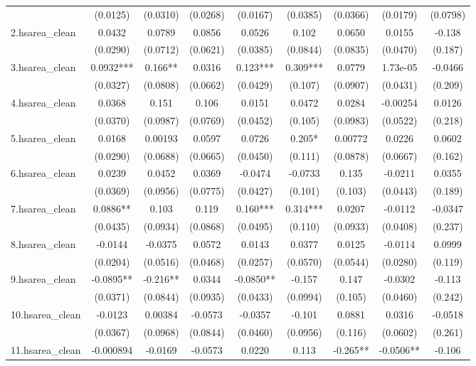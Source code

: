 \documentclass[]{article}
\begin{document}
\begin{tabular}{lcccccccc}
 & (0.0125) & (0.0310) & (0.0268) & (0.0167) & (0.0385) & (0.0366) & (0.0179) & (0.0798) \\
2.hsarea\_clean & 0.0432 & 0.0789 & 0.0856 & 0.0526 & 0.102 & 0.0650 & 0.0155 & -0.138 \\
 & (0.0290) & (0.0712) & (0.0621) & (0.0385) & (0.0844) & (0.0835) & (0.0470) & (0.187) \\
3.hsarea\_clean & 0.0932*** & 0.166** & 0.0316 & 0.123*** & 0.309*** & 0.0779 & 1.73e-05 & -0.0466 \\
 & (0.0327) & (0.0808) & (0.0662) & (0.0429) & (0.107) & (0.0907) & (0.0431) & (0.209) \\
4.hsarea\_clean & 0.0368 & 0.151 & 0.106 & 0.0151 & 0.0472 & 0.0284 & -0.00254 & 0.0126 \\
 & (0.0370) & (0.0987) & (0.0769) & (0.0452) & (0.105) & (0.0983) & (0.0522) & (0.218) \\
5.hsarea\_clean & 0.0168 & 0.00193 & 0.0597 & 0.0726 & 0.205* & 0.00772 & 0.0226 & 0.0602 \\
 & (0.0290) & (0.0688) & (0.0665) & (0.0450) & (0.111) & (0.0878) & (0.0667) & (0.162) \\
6.hsarea\_clean & 0.0239 & 0.0452 & 0.0369 & -0.0474 & -0.0733 & 0.135 & -0.0211 & 0.0355 \\
 & (0.0369) & (0.0956) & (0.0775) & (0.0427) & (0.101) & (0.103) & (0.0443) & (0.189) \\
7.hsarea\_clean & 0.0886** & 0.103 & 0.119 & 0.160*** & 0.314*** & 0.0207 & -0.0112 & -0.0347 \\
 & (0.0435) & (0.0934) & (0.0868) & (0.0495) & (0.110) & (0.0933) & (0.0408) & (0.237) \\
8.hsarea\_clean & -0.0144 & -0.0375 & 0.0572 & 0.0143 & 0.0377 & 0.0125 & -0.0114 & 0.0999 \\
 & (0.0204) & (0.0516) & (0.0468) & (0.0257) & (0.0570) & (0.0544) & (0.0280) & (0.119) \\
9.hsarea\_clean & -0.0895** & -0.216** & 0.0344 & -0.0850** & -0.157 & 0.147 & -0.0302 & -0.113 \\
 & (0.0371) & (0.0844) & (0.0935) & (0.0433) & (0.0994) & (0.105) & (0.0460) & (0.242) \\
10.hsarea\_clean & -0.0123 & 0.00384 & -0.0573 & -0.0357 & -0.101 & 0.0881 & 0.0316 & -0.0518 \\
 & (0.0367) & (0.0968) & (0.0844) & (0.0460) & (0.0956) & (0.116) & (0.0602) & (0.261) \\
11.hsarea\_clean & -0.000894 & -0.0169 & -0.0573 & 0.0220 & 0.113 & -0.265** & -0.0506** & -0.106 \\

\end{tabular}
\end{document}
